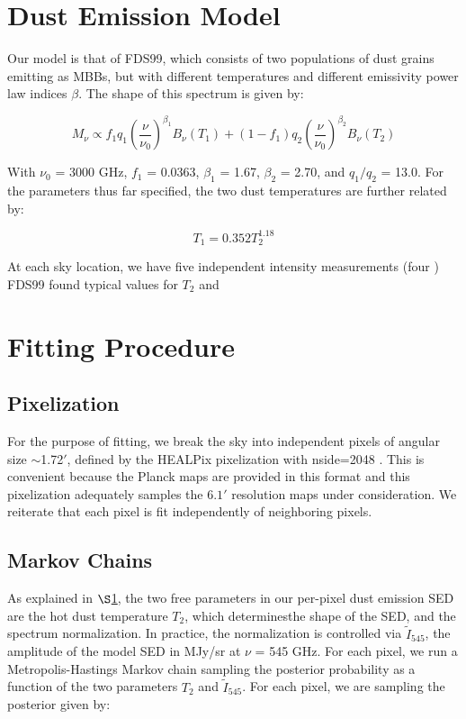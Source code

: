 \documentclass{emulateapj}
\begin{document}
\section{Dust Emission Model}
\label{sec:modeling}

Our model is that of FDS99, which consists of two populations of dust 
grains emitting as MBBs, but with different temperatures and different 
emissivity power law indices $\beta$. The shape of this spectrum is given by:

\begin{equation}
M_{\nu} \propto f_{1}q_{1}(\frac{\nu}{\nu_{0}})^{\beta_1}B_{\nu}(T_1) + (1-f_{1})q_{2}(\frac{\nu}{\nu_0})^{\beta_2}B_{\nu}(T_2)
\end{equation}

With $\nu_0$ = 3000 GHz, $f_{1}$ = 0.0363, $\beta_1$ = 1.67, $\beta_2$ = 2.70, 
and $q_1/q_2$ = 13.0. For the parameters thus far specified, the two dust 
temperatures are further related by:

\begin{equation}
T_1 = 0.352T_2^{1.18}
\end{equation}

At each sky location, we have five independent intensity measurements (four ) 
FDS99 found typical values for $T_2$ and 

\section{Fitting Procedure}
\label{sec:fitting}

\subsection{Pixelization}
\label{sec:pix}
For the purpose of fitting, we break the sky into independent pixels of 
angular size $\sim$1.72$'$, defined by the HEALPix pixelization with nside=2048
\citep{healpix}. This is convenient because the Planck maps are provided in 
this format and this pixelization adequately samples the $6.1'$ resolution maps
under consideration. We reiterate that each pixel is fit independently of 
neighboring pixels.

\subsection{Markov Chains}
As explained in $\S$\ref{sec:modeling}, the two free parameters in our 
per-pixel dust emission SED are the hot dust temperature $T_2$, which 
determinesthe shape of the SED, and the spectrum normalization. In practice,
the normalization is controlled via $\tilde{I}_{545}$, the amplitude of the 
model SED in MJy/sr at $\nu$ = 545 GHz. For each pixel, we run a 
Metropolis-Hastings Markov chain sampling the posterior probability as a 
function of the two parameters $T_2$ and $\tilde{I}_{545}$. For each pixel, we 
are sampling the posterior given by:
\end{document}
